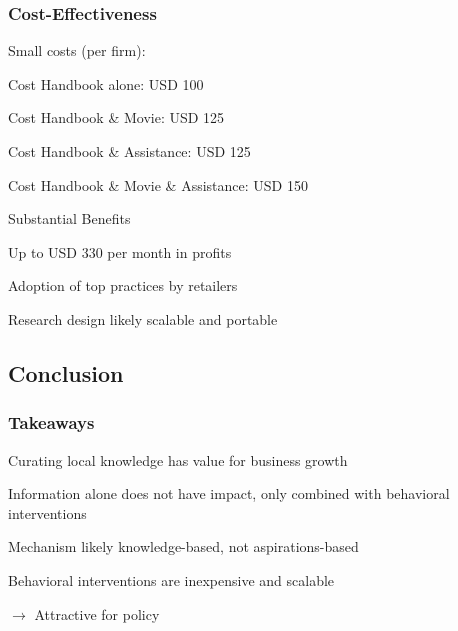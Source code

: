 \documentclass[hideothersubsections, usenames,dvipsnames,11pt]{beamer}
\newenvironment{itemize_2pt}{\itemize\addtolength{\itemsep}{2pt}}{\enditemize}
\begin{document}
\begin{frame}
\frametitle{Cost-Effectiveness}

\textcolor{bdf}{Small costs (per firm)}:
\begin{itemize_2pt}
\item Cost Handbook alone: USD 100
\item Cost Handbook \& Movie: USD 125
\item Cost Handbook \& Assistance: USD 125
\item Cost Handbook \& Movie \& Assistance: USD 150
\end{itemize_2pt}
\vspace{0.5em}

\textcolor{bdf}{Substantial Benefits}
\begin{itemize_2pt}
\item Up to USD 330 per month in profits
\item Adoption of top practices by retailers
\end{itemize_2pt}

\vspace{0.5em}
Research design likely \textcolor{bdf}{scalable and portable}

\end{frame}

\subsection{Conclusion}
\begin{frame}
\frametitle{Takeaways}
\begin{itemize_2pt}
    \item \textcolor{bdf}{Curating local knowledge has value for business growth} 
    \item Information alone does not have impact, only combined with \textcolor{bdf}{behavioral interventions}
    \item Mechanism likely \textcolor{bdf}{knowledge-based}, not aspirations-based
	\item Behavioral interventions are \textcolor{bdf}{inexpensive and scalable}
	\item[] $\rightarrow$  Attractive for policy
    
\end{itemize_2pt}
\end{frame}





\end{document}
